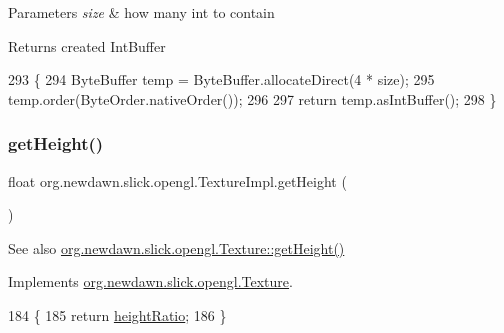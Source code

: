 \begin{DoxyParams}{Parameters}
{\em size} & how many int to contain \\
\hline
\end{DoxyParams}
\begin{DoxyReturn}{Returns}
created Int\+Buffer 
\end{DoxyReturn}

\begin{DoxyCode}
293                                                   \{
294       ByteBuffer temp = ByteBuffer.allocateDirect(4 * size);
295       temp.order(ByteOrder.nativeOrder());
296 
297       \textcolor{keywordflow}{return} temp.asIntBuffer();
298     \}    
\end{DoxyCode}
\mbox{\label{classorg_1_1newdawn_1_1slick_1_1opengl_1_1_texture_impl_a116a321d3df28cc159044c41b4f463ea}} 
\subsubsection{\texorpdfstring{get\+Height()}{getHeight()}}
{\footnotesize\ttfamily float org.\+newdawn.\+slick.\+opengl.\+Texture\+Impl.\+get\+Height (\begin{DoxyParamCaption}{ }\end{DoxyParamCaption})\hspace{0.3cm}{\ttfamily [inline]}}

\begin{DoxySeeAlso}{See also}
\mbox{\hyperlink{interfaceorg_1_1newdawn_1_1slick_1_1opengl_1_1_texture_a5a31b691118b19d5fa0bc605fa458ccd}{org.\+newdawn.\+slick.\+opengl.\+Texture\+::get\+Height()}} 
\end{DoxySeeAlso}


Implements \mbox{\hyperlink{interfaceorg_1_1newdawn_1_1slick_1_1opengl_1_1_texture_a5a31b691118b19d5fa0bc605fa458ccd}{org.\+newdawn.\+slick.\+opengl.\+Texture}}.


\begin{DoxyCode}
184                              \{
185         \textcolor{keywordflow}{return} \mbox{\hyperlink{classorg_1_1newdawn_1_1slick_1_1opengl_1_1_texture_impl_a8df2772434fe39ed8a5ad06042515385}{heightRatio}};
186     \}
\end{DoxyCode}
\mbox{\label{classorg_1_1newdawn_1_1slick_1_1opengl_1_1_texture_impl_a377019eb21fcdf1d9eb340b6ca3cca12}} 

